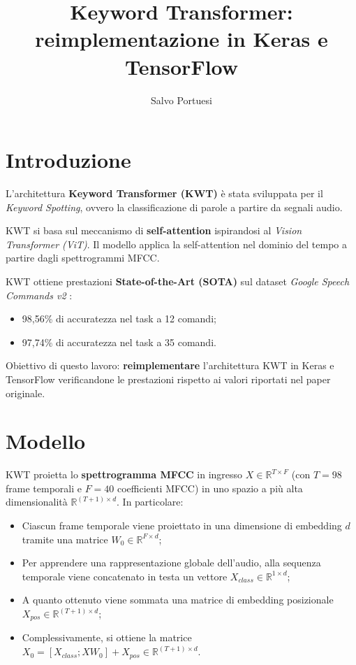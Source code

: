\documentclass[11pt, a4paper]{article}
\title{Keyword Transformer: reimplementazione in Keras e TensorFlow}
\author{Salvo Portuesi}
\date{}
\begin{document}
\maketitle

\section{Introduzione}

L'architettura \textbf{Keyword Transformer (KWT)} \cite{Berg_2021} è stata sviluppata per il \textit{Keyword Spotting}, ovvero la classificazione di parole a partire da segnali audio.

KWT si basa sul meccanismo di \textbf{self-attention} ispirandosi al \textit{Vision Transformer (ViT)}. Il modello applica la self-attention nel dominio del tempo a partire dagli spettrogrammi MFCC.

KWT ottiene prestazioni \textbf{State-of-the-Art (SOTA)} sul dataset \textit{Google Speech Commands v2} \cite{warden2018speechcommandsdatasetlimitedvocabulary}:
\begin{itemize}
  \item 98,56\% di accuratezza nel task a 12 comandi;
  \item 97,74\% di accuratezza nel task a 35 comandi.
\end{itemize}

Obiettivo di questo lavoro: \textbf{reimplementare} l'architettura KWT in Keras e TensorFlow verificandone le prestazioni rispetto ai valori riportati nel paper originale.

\section{Modello}

KWT proietta lo \textbf{spettrogramma MFCC} in ingresso $X \in \mathbb{R}^{T \times F}$ (con $T=98$ frame temporali e $F=40$ coefficienti MFCC) in uno spazio a più alta dimensionalità $\mathbb{R}^{(T+1) \times d}$. In particolare:
\begin{itemize}
  \item Ciascun frame temporale viene proiettato in una dimensione di embedding $d$ tramite una matrice $W_0 \in \mathbb{R}^{F \times d}$;
  \item Per apprendere una rappresentazione globale dell'audio, alla sequenza temporale viene concatenato in testa un vettore $X_{class} \in \mathbb{R}^{1 \times d}$;
  \item A quanto ottenuto viene sommata una matrice di embedding posizionale $X_{pos} \in \mathbb{R}^{(T+1) \times d}$;
  \item Complessivamente, si ottiene la matrice $X_0 = [X_{class}; X W_0] + X_{pos} \in \mathbb{R}^{(T+1) \times d}$.
\end{itemize}
\end{document}
